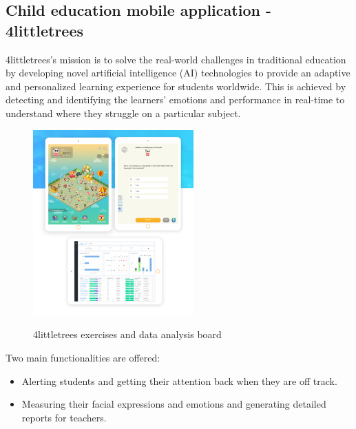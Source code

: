 \documentclass[12pt,a4paper,oneside,english]{book}
\begin{document}
\subsection{Child education mobile application - 4littletrees}
4littletrees's mission is to solve the real-world challenges in traditional education by developing novel artificial intelligence (AI) technologies to provide an adaptive and personalized learning experience for students worldwide. This is achieved by detecting and identifying the learners’ emotions and performance in real-time to understand where they struggle on a particular subject.
\begin{figure}[H]
    \centering
    \includegraphics[width=0.55\textwidth]{figures/State of art/4littletrees.PNG}
    \caption{4littletrees exercises and data analysis board}
    \label{fig:4littletrees}
    \cite{4littletrees}
\end{figure}
\noindent
Two main functionalities are offered: 
\begin{itemize}
    \item Alerting students and getting their attention back when they are off track.
    \item Measuring their facial expressions and emotions and generating detailed reports for teachers.
\end{itemize}
\end{document}
